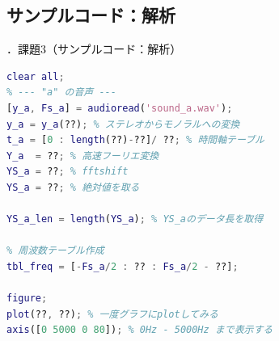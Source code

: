 \documentclass[aspectratio=43]{beamer}
\newcommand{\showsec}{\thesection ．}
\begin{document}
\subsection{サンプルコード：解析}
\begin{frame}[t,containsverbatim]{\showsec 課題3（サンプルコード：解析）}
    \begin{lstlisting}[language=Matlab]
clear all;
% --- "a" の音声 ---
[y_a, Fs_a] = audioread('sound_a.wav');
y_a = y_a(??); % ステレオからモノラルへの変換
t_a = [0 : length(??)-??]/ ??; % 時間軸テーブル
Y_a  = ??; % 高速フーリエ変換
YS_a = ??; % fftshift
YS_a = ??; % 絶対値を取る

YS_a_len = length(YS_a); % YS_aのデータ長を取得

% 周波数テーブル作成
tbl_freq = [-Fs_a/2 : ?? : Fs_a/2 - ??];

figure;
plot(??, ??); % 一度グラフにplotしてみる
axis([0 5000 0 80]); % 0Hz - 5000Hz まで表示する
\end{lstlisting}
\end{frame}
\end{document}
